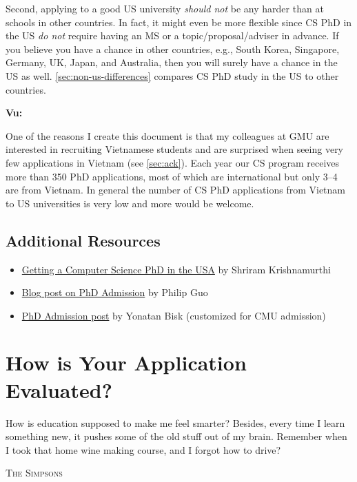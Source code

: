 \documentclass[oneside,11pt,dvipsnames]{book}
\newenvironment{commentbox}[1][]{
  \small
  \begin{mybox}
    {\small \textbf{#1}}
  }{
  \end{mybox}
}
\begin{document}
Second, applying to a good US university \emph{should not} be any harder than at schools in other countries. In fact, it might even be more flexible since CS PhD in the US \emph{do not} require having an MS or a topic/proposal/adviser in advance. If you believe you have a chance in other countries, e.g., South Korea, Singapore, Germany, UK, Japan, and Australia, then you will surely have a chance in the US as well. \autoref{sec:non-us-differences} compares CS PhD study in the US to other countries.

\begin{commentbox}[Vu:]
  One of the reasons I create this document is that my colleagues at GMU are interested in recruiting Vietnamese students and are surprised when seeing very few applications in Vietnam (see \autoref{sec:ack}). Each year our CS program receives more than 350 PhD applications, most of which are international but only 3--4 are from Vietnam. In general the number of CS PhD applications from Vietnam to US universities is very low and more would be welcome.
\end{commentbox}




\section*{Additional Resources}
\begin{itemize}
  \item \href{https://parentheticallyspeaking.org/articles/us-cs-phd-faq/}{Getting a Computer Science PhD in the USA} by Shriram Krishnamurthi
  \item  \href{https://pg.ucsd.edu/PhD-application-tips.htm}{Blog post on PhD Admission} by Philip Guo
  \item   \href{https://talkingtorobots.com/yonatanbisk.html}{PhD Admission post} by Yonatan Bisk (customized for CMU admission)
\end{itemize}

\chapter{How is Your Application Evaluated?}\label{sec:evalapps}

\epigraph{How is education supposed to make me feel smarter? Besides, every time I learn something new, it pushes some of the old stuff out of my brain. Remember when I took that home wine making course, and I forgot how to drive?}{\textsc{The Simpsons}}
\end{document}
